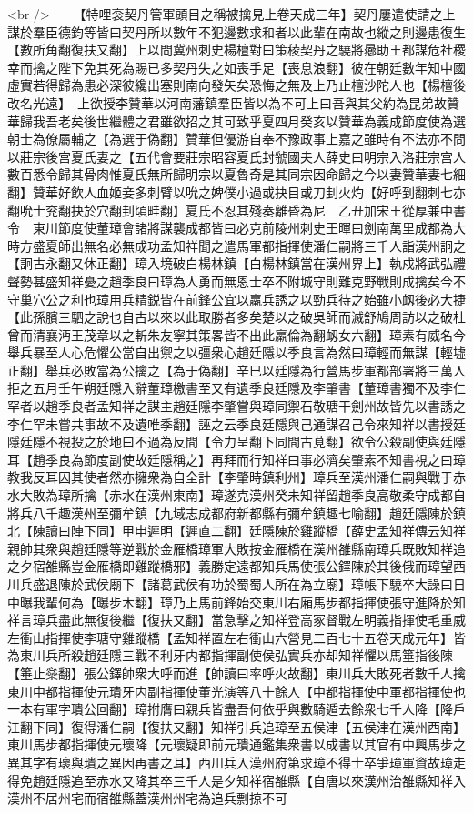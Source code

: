 <br />
　　【特哩衮契丹管軍頭目之稱被擒見上卷天成三年】契丹屢遣使請之上謀於羣臣德鈞等皆曰契丹所以數年不犯邊數求和者以此輩在南故也縱之則邊患復生【數所角翻復扶又翻】上以問冀州刺史楊檀對曰策稜契丹之驍將曏助王都謀危社稷幸而擒之陛下免其死為賜已多契丹失之如喪手足【喪息浪翻】彼在朝廷數年知中國虛實若得歸為患必深彼纔出塞則南向發矢矣恐悔之無及上乃止檀沙陀人也【楊檀後改名光遠】　上欲授李贊華以河南藩鎮羣臣皆以為不可上曰吾與其父約為昆弟故贊華歸我吾老矣後世繼體之君雖欲招之其可致乎夏四月癸亥以贊華為義成節度使為選朝士為僚屬輔之【為選于偽翻】贊華但優游自奉不豫政事上嘉之雖時有不法亦不問以莊宗後宫夏氏妻之【五代會要莊宗昭容夏氏封虢國夫人薛史曰明宗入洛莊宗宫人數百悉令歸其骨肉惟夏氏無所歸明宗以夏魯奇是其同宗因命歸之今以妻贊華妻七細翻】贊華好飲人血姬妾多刺臂以吮之婢僕小過或抉目或刀刲火灼【好呼到翻刺七亦翻吮士兖翻抉於穴翻刲頃畦翻】夏氏不忍其殘奏離昏為尼　乙丑加宋王從厚兼中書令　東川節度使董璋會諸將謀襲成都皆曰必克前陵州刺史王暉曰劍南萬里成都為大時方盛夏師出無名必無成功孟知祥聞之遣馬軍都指揮使潘仁嗣將三千人詣漢州詗之【詗古永翻又休正翻】璋入境破白楊林鎮【白楊林鎮當在漢州界上】執戍將武弘禮聲勢甚盛知祥憂之趙季良曰璋為人勇而無恩士卒不附城守則難克野戰則成擒矣今不守巢穴公之利也璋用兵精鋭皆在前鋒公宜以羸兵誘之以勁兵待之始雖小衂後必大捷【此孫臏三駟之說也自古以來以此取勝者多矣楚以之破吳師而滅舒鳩周訪以之破杜曾而清襄沔王茂章以之斬朱友寧其策畧皆不出此羸倫為翻衂女六翻】璋素有威名今舉兵暴至人心危懼公當自出禦之以彊衆心趙廷隱以季良言為然曰璋輕而無謀【輕墟正翻】舉兵必敗當為公擒之【為于偽翻】辛巳以廷隱為行營馬步軍都部署將三萬人拒之五月壬午朔廷隱入辭董璋檄書至又有遺季良廷隱及李肇書【董璋書獨不及李仁罕者以趙季良者孟知祥之謀主趙廷隱李肇嘗與璋同禦石敬瑭干劍州故皆先以書誘之李仁罕未嘗共事故不及遺唯季翻】誣之云季良廷隱與己通謀召己令來知祥以書授廷隱廷隱不視投之於地曰不過為反間【令力呈翻下同間古莧翻】欲令公殺副使與廷隱耳【趙季良為節度副使故廷隱稱之】再拜而行知祥曰事必濟矣肇素不知書視之曰璋教我反耳囚其使者然亦擁衆為自全計【李肇時鎮利州】璋兵至漢州潘仁嗣與戰于赤水大敗為璋所擒【赤水在漢州東南】璋遂克漢州癸未知祥留趙季良高敬柔守成都自將兵八千趣漢州至彌牟鎮【九域志成都府新都縣有彌牟鎮趣七喻翻】趙廷隱陳於鎮北【陳讀曰陣下同】甲申遲明【遲直二翻】廷隱陳於雞蹤橋【薛史孟知祥傳云知祥親帥其衆與趙廷隱等逆戰於金雁橋璋軍大敗按金雁橋在漢州雒縣南璋兵既敗知祥追之夕宿雒縣豈金雁橋即雞蹤橋邪】義勝定遠都知兵馬使張公鐸陳於其後俄而璋望西川兵盛退陳於武侯廟下【諸葛武侯有功於蜀蜀人所在為立廟】璋帳下驍卒大譟曰日中曝我輩何為【曝步木翻】璋乃上馬前鋒始交東川右廂馬步都指揮使張守進降於知祥言璋兵盡此無復後繼【復扶又翻】當急擊之知祥登高冢督戰左明義指揮使毛重威左衝山指揮使李瑭守雞蹤橋【孟知祥置左右衝山六營見二百七十五卷天成元年】皆為東川兵所殺趙廷隱三戰不利牙内都指揮副使侯弘實兵亦却知祥懼以馬箠指後陳【箠止橤翻】張公鐸帥衆大呼而進【帥讀曰率呼火故翻】東川兵大敗死者數千人擒東川中都指揮使元璝牙内副指揮使董光演等八十餘人【中都指揮使中軍都指揮使也一本有軍字璝公回翻】璋拊膺曰親兵皆盡吾何依乎與數騎遁去餘衆七千人降【降戶江翻下同】復得潘仁嗣【復扶又翻】知祥引兵追璋至五侯津【五侯津在漢州西南】東川馬步都指揮使元瓌降【元瓌疑即前元璝通鑑集衆書以成書以其官有中興馬步之異其字有瓌與璝之異因再書之耳】西川兵入漢州府第求璋不得士卒爭璋軍資故璋走得免趙廷隱追至赤水又降其卒三千人是夕知祥宿雒縣【自唐以來漢州治雒縣知祥入漢州不居州宅而宿雒縣蓋漢州州宅為追兵剽掠不可
